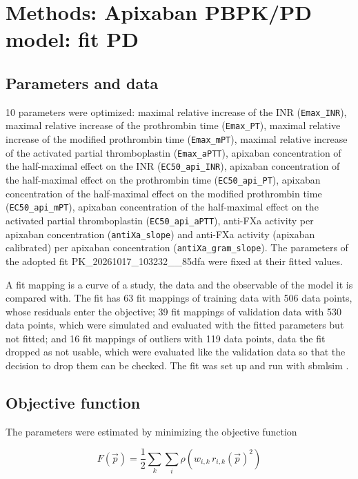 \section{Methods: Apixaban PBPK/PD model: fit PD}

\subsection{Parameters and data}

10 parameters were optimized: maximal relative increase of the INR (\texttt{Emax\_INR}), maximal relative increase of the prothrombin time (\texttt{Emax\_PT}), maximal relative increase of the modified prothrombin time (\texttt{Emax\_mPT}), maximal relative increase of the activated partial thromboplastin (\texttt{Emax\_aPTT}), apixaban concentration of the half-maximal effect on the INR (\texttt{EC50\_api\_INR}), apixaban concentration of the half-maximal effect on the prothrombin time (\texttt{EC50\_api\_PT}), apixaban concentration of the half-maximal effect on the modified prothrombin time (\texttt{EC50\_api\_mPT}), apixaban concentration of the half-maximal effect on the activated partial thromboplastin (\texttt{EC50\_api\_aPTT}), anti-FXa activity per apixaban concentration (\texttt{antiXa\_slope}) and anti-FXa activity (apixaban calibrated) per apixaban concentration (\texttt{antiXa\_gram\_slope}). The parameters of the adopted fit PK\_20261017\_103232\_\_85dfa were fixed at their fitted values.

A fit mapping is a curve of a study, the data and the observable of the model it is compared with. The fit has 63 fit mappings of training data with 506 data points, whose residuals enter the objective; 39 fit mappings of validation data with 530 data points, which were simulated and evaluated with the fitted parameters but not fitted; and 16 fit mappings of outliers with 119 data points, data the fit dropped as not usable, which were evaluated like the validation data so that the decision to drop them can be checked. The fit was set up and run with sbmlsim \cite{Koenig2026_sbmlsim}.

\subsection{Objective function}

The parameters were estimated by minimizing the objective function

\begin{equation}
F(\vec{p}) = \frac{1}{2} \sum_{k} \sum_{i} \rho\left(w_{i,k}\, r_{i,k}(\vec{p})^2\right)
\end{equation}

